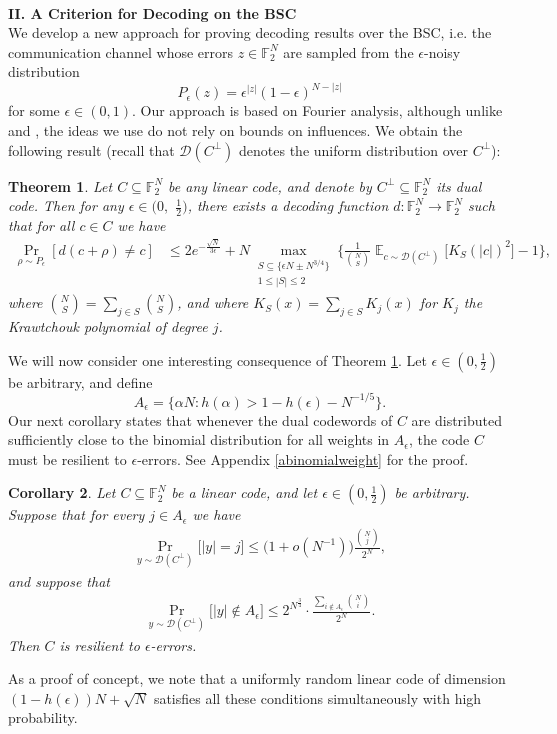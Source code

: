 \documentclass[12pt]{article}
\newtheorem{theorem}{Theorem}
\newtheorem{corollary}[theorem]{Corollary}
\newcommand{\F}{\mathbb{F}}
\newcommand{\E}{\mathop \mathbb{E}}
\begin{document}
\hfill\\
\textbf{II. A Criterion for Decoding on the BSC}
\hfill\\
We develop a new approach for proving decoding results over the BSC, i.e. the communication channel whose errors $z\in\F_2^N$ are sampled from the $\epsilon$-noisy distribution
$$P_\epsilon(z)=\epsilon^{|z|}(1-\epsilon)^{N-|z|}$$
for some $\epsilon\in(0,1)$. 
Our approach is based on Fourier analysis, although unlike \cite{kudekar2016erasure} and \cite{hazla2021polyclose}, the ideas we use do not rely on bounds on influences. 
We obtain the following result (recall that $\mathcal{D}(C^\perp)$ denotes the uniform distribution over $C^\perp$):
\begin{theorem}\label{fouriercriterionunique}
Let $C\subseteq\F_2^N$ be any linear code, and denote by $C^\perp\subseteq\F_2^N$ its dual code. Then for any $\epsilon \in (0,$ $\frac{1}{2})$, there exists a decoding function $d:\F_2^N\rightarrow\F_2^N$ 
such that for all $c\in C$ we have
\begin{align*}
    \Pr_{\rho\sim P_\epsilon}[ d(c+\rho)\neq c]&\leq 2e^{-\frac{\sqrt{N}}{3\epsilon}}+N \mathop{\max}_{\substack{S\subseteq \{\epsilon N\pm N^{3/4}\} \\
    1\leq|S|\leq 2}} \Big\{  \frac{1}{\binom{N}{S}}\E_{c\sim\mathcal{D}(C^\perp)}\big[ K_S(|c|)^2\big]-1 \Big\},
\end{align*}
where $\binom{N}{S}=\sum_{j\in S}\binom{N}{S}$, and where $K_S(x)=\sum_{j\in S}K_j(x)$ for $K_j$ the Krawtchouk polynomial of degree $j$.
\end{theorem}
We will now consider one interesting consequence of Theorem \ref{fouriercriterionunique}. Let $\epsilon\in(0,\frac{1}{2})$ be arbitrary, and define $$A_\epsilon=\{\alpha N:h(\alpha)>1-h(\epsilon)-N^{-1/5}\}.$$
Our next corollary states that whenever the dual codewords of $C$ are distributed sufficiently close to the binomial distribution for all weights in $A_\epsilon$, the code $C$ must be resilient to $\epsilon$-errors. See Appendix \ref{abinomialweight} for the proof.
\begin{corollary}\label{weightunique}
Let $C\subseteq\F_2^N$ be a linear code, and let $\epsilon\in(0,\frac{1}{2})$ be arbitrary.
Suppose that for every $j\in A_\epsilon$ we have
\begin{align*}
    \Pr_{y\sim\mathcal{D}(C^\perp)}\big[|y|=j\big]\leq \big( 1+o(N^{-1})  \big)\frac{\binom{N}{j}}{2^N},
\end{align*}
and suppose that
\begin{align*}
    \Pr_{y\sim\mathcal{D}(C^\perp)}\big[|y|\notin A_\epsilon\big]\leq 2^{N^{\frac{3}{4}}}\cdot \frac{\sum_{i\notin A_\epsilon}\binom{N}{i}}{2^N}.
\end{align*}
Then $C$ is resilient to $\epsilon$-errors.
\end{corollary}
As a proof of concept, we note that a uniformly random linear code of dimension $(1-h(\epsilon))N+\sqrt{N}$ satisfies all these conditions simultaneously with high probability.
\end{document}

